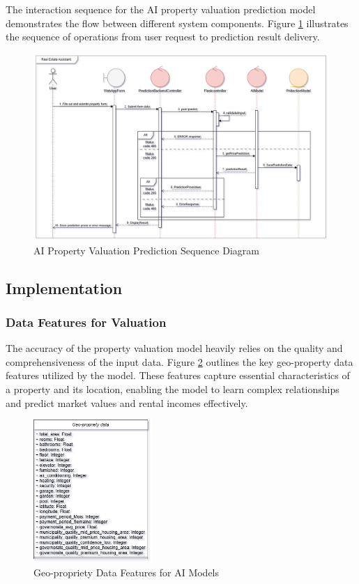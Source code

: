 \newpage
The interaction sequence for the AI property valuation prediction model demonstrates the flow between different system components. Figure \ref{fig:ai-prediction-sequence-model} illustrates the sequence of operations from user request to prediction result delivery.

\begin{figure}[htbp]
    \centering
    \includegraphics[width=1\textwidth]{images/sequence_AI_prediction_model.png}
    \caption{AI Property Valuation Prediction Sequence Diagram}
    \label{fig:ai-prediction-sequence-model}
\end{figure}

\subsection{Implementation}
\subsubsection{Data Features for Valuation}
The accuracy of the property valuation model heavily relies on the quality and comprehensiveness of the input data. Figure \ref{fig:geo-propriety-data} outlines the key geo-property data features utilized by the model. These features capture essential characteristics of a property and its location, enabling the model to learn complex relationships and predict market values and rental incomes effectively.
\newpage
\begin{figure}[htbp]
    \centering
    \includegraphics[width=0.4\textwidth]{images/geo-propriety-data.png} %
    \caption{Geo-propriety Data Features for AI Models}
    \label{fig:geo-propriety-data}
\end{figure}

